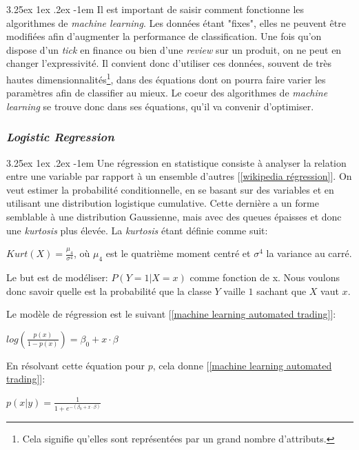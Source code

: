 \documentclass[a4paper, 11pt]{article}
\makeatletter
\renewcommand\paragraph{\@startsection{paragraph}{5}{\z@}%
  {3.25ex \@plus1ex \@minus.2ex}%
  {-1em}%
  {\normalfont\normalsize\bfseries}}
\makeatother
\begin{document}
\paragraph{}
Il est important de saisir comment fonctionne les algorithmes de \textit{machine learning}. Les données étant "fixes", elles ne peuvent être modifiées afin d'augmenter la performance de classification. Une fois qu'on dispose d'un \textit{tick} en finance ou bien d'une \textit{review}  sur un produit, on ne peut en changer l'expressivité. Il convient donc d'utiliser ces données, souvent de très hautes dimensionnalités\footnote{Cela signifie qu'elles sont représentées par un grand nombre d'attributs.}, dans des équations dont on pourra faire varier les paramètres afin de classifier au mieux. Le coeur des algorithmes de \textit{machine learning} se trouve donc dans ses équations, qu'il va convenir d'optimiser.

\subsubsection{\textit{Logistic Regression}} \label{section régression logistique}
\paragraph{}
Une régression en statistique consiste à analyser la relation entre une variable par rapport à un ensemble d'autres [\ref{wikipedia régression}]. On veut estimer la probabilité conditionnelle, en se basant sur des variables et en utilisant une distribution logistique cumulative. Cette dernière a un forme semblable à une distribution Gaussienne, mais avec des queues épaisses et donc une \textit{kurtosis} plus élevée. La \textit{kurtosis} étant définie comme suit:
\begin{center}
$Kurt(X) = \frac{\mu_4}{\sigma^4}$, où $\mu_4$ est le quatrième moment centré et $\sigma^4$ la variance au carré. 
\end{center}
Le but est de modéliser: $P(Y=1 | X=x)$ comme fonction de x. Nous voulons donc savoir quelle est la probabilité que la classe $Y$ vaille $1$ sachant que $X$ vaut $x$.

Le modèle de régression est le suivant [\ref{machine learning automated trading}]:
\begin{center}
$log(\frac{p(x)}{1 - p(x)}) = \beta_0 + x \cdot \beta$
\end{center}

En résolvant cette équation pour $p$, cela donne [\ref{machine learning automated trading}]:
\begin{center}
$p(x|y) = \frac{1}{1 + e^{-(\beta_0 + x \cdot \beta)}}$
\end{center}
\end{document}
